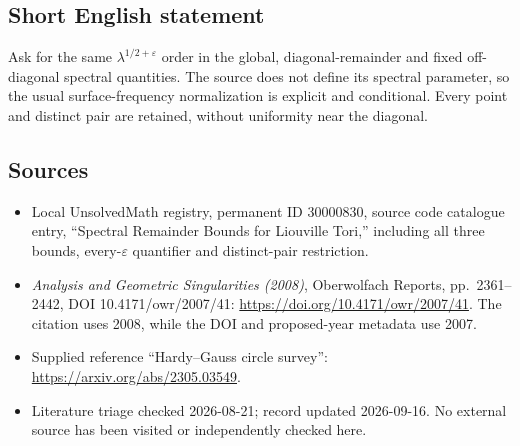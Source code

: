 \documentclass[11pt]{article}
\begin{document}
\subsection{Short English statement}
Ask for the same \(\lambda^{1/2+\varepsilon}\) order in the global, diagonal-remainder and fixed off-diagonal spectral quantities. The source does not define its spectral parameter, so the usual surface-frequency normalization is explicit and conditional. Every point and distinct pair are retained, without uniformity near the diagonal.
\subsection{Sources}
\begin{itemize}
\item Local UnsolvedMath registry, permanent ID 30000830, source code catalogue entry, ``Spectral Remainder Bounds for Liouville Tori,'' including all three bounds, every-\(\varepsilon\) quantifier and distinct-pair restriction.
\item \emph{Analysis and Geometric Singularities (2008)}, Oberwolfach Reports, pp.\ 2361--2442, DOI 10.4171/owr/2007/41: \url{https://doi.org/10.4171/owr/2007/41}. The citation uses 2008, while the DOI and proposed-year metadata use 2007.
\item Supplied reference ``Hardy--Gauss circle survey'': \url{https://arxiv.org/abs/2305.03549}.
\item Literature triage checked 2026-08-21; record updated 2026-09-16. No external source has been visited or independently checked here.
\end{itemize}
\end{document}
